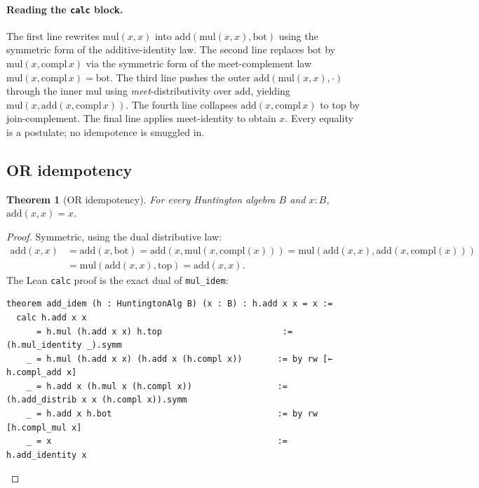\documentclass[11pt]{article}
\newtheorem{theorem}{Theorem}[section]
\theoremstyle{definition}
\begin{document}
\paragraph{Reading the \texttt{calc} block.}
The first line rewrites $\mathrm{mul}(x,x)$ into $\mathrm{add}(\mathrm{mul}(x,x),\mathrm{bot})$
using the symmetric form of the additive-identity law. The second line replaces
$\mathrm{bot}$ by $\mathrm{mul}(x,\mathrm{compl}\,x)$ via the symmetric form of
the meet-complement law $\mathrm{mul}(x,\mathrm{compl}\,x)=\mathrm{bot}$. The
third line pushes the outer $\mathrm{add}(\mathrm{mul}(x,x),\cdot)$ through the
inner $\mathrm{mul}$ using \emph{meet}-distributivity over $\mathrm{add}$,
yielding $\mathrm{mul}(x,\mathrm{add}(x,\mathrm{compl}\,x))$. The fourth line
collapses $\mathrm{add}(x,\mathrm{compl}\,x)$ to $\mathrm{top}$ by
join-complement. The final line applies meet-identity to obtain $x$. Every
equality is a postulate; no idempotence is smuggled in.

\subsection{OR idempotency}
\label{sec:boole-add}

\begin{theorem}[OR idempotency]\label{thm:addidem}
For every Huntington algebra $B$ and $x:B$, $\mathrm{add}(x,x)=x$.
\end{theorem}
\begin{proof}
Symmetric, using the dual distributive law:
\begin{align*}
\mathrm{add}(x,x)
 &= \mathrm{add}(x,\mathrm{bot})
  = \mathrm{add}(x,\mathrm{mul}(x,\mathrm{compl}(x)))
  = \mathrm{mul}(\mathrm{add}(x,x),\mathrm{add}(x,\mathrm{compl}(x)))\\
 &= \mathrm{mul}(\mathrm{add}(x,x),\mathrm{top})
  = \mathrm{add}(x,x).\tag*{\qedhere}
\end{align*}
The Lean \texttt{calc} proof is the exact dual of \texttt{mul\_idem}:
\begin{lstlisting}[language=leanL,caption={OR idempotency (Boole\_Idempotency.lean).}]
theorem add_idem (h : HuntingtonAlg B) (x : B) : h.add x x = x :=
  calc h.add x x
      = h.mul (h.add x x) h.top                        := (h.mul_identity _).symm
    _ = h.mul (h.add x x) (h.add x (h.compl x))       := by rw [← h.compl_add x]
    _ = h.add x (h.mul x (h.compl x))                 := (h.add_distrib x x (h.compl x)).symm
    _ = h.add x h.bot                                 := by rw [h.compl_mul x]
    _ = x                                             := h.add_identity x
\end{lstlisting}
\end{proof}
\end{document}
